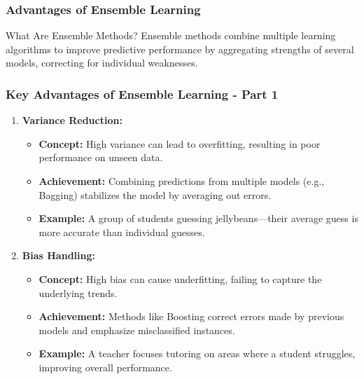 \documentclass[aspectratio=169]{beamer}
\begin{document}
\begin{frame}[fragile]
    \frametitle{Advantages of Ensemble Learning}
    \begin{block}{What Are Ensemble Methods?}
        Ensemble methods combine multiple learning algorithms to improve predictive performance by aggregating strengths of several models, correcting for individual weaknesses.
    \end{block}
\end{frame}

\begin{frame}[fragile]
    \frametitle{Key Advantages of Ensemble Learning - Part 1}
    \begin{enumerate}
        \item \textbf{Variance Reduction:}
            \begin{itemize}
                \item \textbf{Concept:} High variance can lead to overfitting, resulting in poor performance on unseen data.
                \item \textbf{Achievement:} Combining predictions from multiple models (e.g., Bagging) stabilizes the model by averaging out errors.
                \item \textbf{Example:} A group of students guessing jellybeans—their average guess is more accurate than individual guesses.
            \end{itemize}
        
        \item \textbf{Bias Handling:}
            \begin{itemize}
                \item \textbf{Concept:} High bias can cause underfitting, failing to capture the underlying trends.
                \item \textbf{Achievement:} Methods like Boosting correct errors made by previous models and emphasize misclassified instances.
                \item \textbf{Example:} A teacher focuses tutoring on areas where a student struggles, improving overall performance.
            \end{itemize}
    \end{enumerate}
\end{frame}
\end{document}
